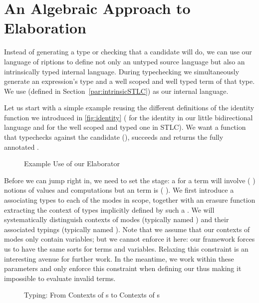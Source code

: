 \section{An Algebraic Approach to Elaboration}\label{section:elaboration}

Instead of generating a type or checking that a candidate will do, we
can use our language of riptions to define not only an
untyped source language but also an intrinsically typed internal
language. During typechecking we simultaneously generate an
expression's type and a well scoped and well typed term of that
type. We use  (defined in Section~\ref{par:intrinsicSTLC}) as
our internal language.

Let us start with a simple example reusing the different definitions of
the identity function we introduced in \cref{fig:identity}
( for the identity in our little bidirectional
language and  for the well scoped and typed one
in STLC). We want a function that typechecks 
against the candidate (), succeeds and returns the
fully annotated .

\begin{figure}[h]
\caption{Example Use of our Elaborator}
\end{figure}

Before we can jump right in, we need to set the stage: a  for
a  term will involve ({ }) notions of values
and computations but an  term is ({ }).
%
We first introduce a  associating types to each of the modes in
scope, together with an erasure function  extracting the context
of types implicitly defined by such a .
%
We will systematically distinguish contexts of modes (typically named )
and their associated typings (typically named ). Note that we assume
that our contexts of modes only contain  variables; but we cannot
enforce it here: our framework forces us to have the same sorts for terms
and variables. Relaxing this constraint is an interesting avenue for further
work. In the meantime, we work within these parameters and only enforce this
constraint when defining our  thus making it impossible to
evaluate invalid terms.

\begin{figure}[h]
\begin{minipage}[t]{0.4\textwidth}
\end{minipage}
\begin{minipage}[t]{0.5\textwidth}
\end{minipage}
\caption{Typing: From Contexts of s to Contexts of s\label{fig:typingmodes}}
\end{figure}


